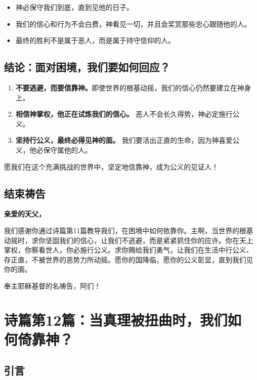 \documentclass[a4paper, 12pt]{article}
\begin{document}
\begin{itemize}
    \item 神必保守我们到底，直到见他的日子。
    \item 我们的信心和行为不会白费，神看见一切，并且会奖赏那些忠心跟随他的人。
    \item 最终的胜利不是属于恶人，而是属于持守信仰的人。
\end{itemize}



\subsection*{结论：面对困境，我们要如何回应？}

\begin{enumerate}
    \item \textbf{不要逃避，而要信靠神。}即使世界的根基动摇，我们的信心仍然要建立在神身上。
    \item \textbf{相信神掌权，他正在试炼我们的信心。} 恶人不会长久得势，神必定施行公义。  
    \item \textbf{坚持行公义，最终必得见神的面。} 我们要活出正直的生命，因为神喜爱公义，他必保守属他的人。  
\end{enumerate}

愿我们在这个充满挑战的世界中，坚定地信靠神，成为公义的见证人！ 



\subsection*{结束祷告}

\textbf{亲爱的天父，}

我们感谢你通过诗篇第11篇教导我们，在困境中如何依靠你。主啊，当世界的根基动摇时，求你坚固我们的信心，让我们不逃避，而是紧紧抓住你的应许。你在天上掌权，你察看世人，你必施行公义。求你赐给我们勇气，让我们在生活中行公义、存正直，不被世界的恶势力所动摇。愿你的国降临，愿你的公义彰显，直到我们见你的面。

奉主耶稣基督的名祷告，阿们！

\newpage
\section{诗篇第12篇：当真理被扭曲时，我们如何倚靠神？}
\subsection*{引言}
\end{document}
